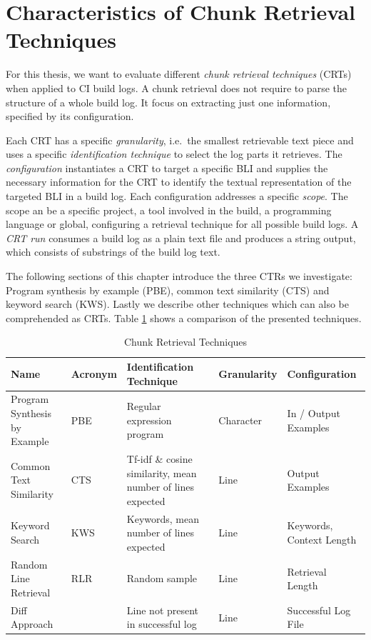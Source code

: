\documentclass[\myrootdir/main.tex]{subfiles}
\begin{document}
\section{Characteristics of Chunk Retrieval Techniques}
\label{sec:blirt}
For this thesis, we want to evaluate different \emph{chunk retrieval techniques} (CRTs) when applied to CI build logs.
A chunk retrieval does not require to parse the structure of a whole build log.
It focus on extracting just one information, specified by its configuration.

Each CRT has a specific \textit{granularity}, i.e.\ the smallest retrievable text piece and uses a specific \textit{identification technique} to select the log parts it retrieves.
The \textit{configuration} instantiates a CRT to target a specific BLI and supplies the necessary information for the CRT to identify the textual representation of the targeted BLI in a build log.
Each configuration addresses a specific \textit{scope}.
The scope an be a specific project, a tool involved in the build, a programming language or global, configuring a retrieval technique for all possible build logs.
A \textit{CRT run} consumes a build log as a plain text file and produces a string output, which consists of substrings of the build log text.

The following sections of this chapter introduce the three CTRs we investigate: Program synthesis by example (PBE), common text similarity (CTS) and keyword search (KWS).
Lastly we describe other techniques which can also be comprehended as CRTs.
Table \ref{tab:ctr} shows a comparison of the presented techniques.

\begin{table}[htbp]
\centering
\caption{Chunk Retrieval Techniques}
\begin{tabularx}{\textwidth}{|X|l|X|l|X|} 
\hline
Name                         & Acronym & Identification Technique                                   & Granularity & Configuration             \\ 
\hline
\hline
Program Synthesis by Example & PBE     & Regular expression program                                 & Character   & In / Output Examples      \\
\hline
Common Text Similarity       & CTS     & Tf-idf \& cosine similarity, mean number of lines expected & Line        & Output Examples           \\
\hline
Keyword Search               & KWS     & Keywords, mean number of lines expected                    & Line        & Keywords, Context Length  \\
\hline
Random Line Retrieval        & RLR     & Random sample                                              & Line        & Retrieval Length          \\
\hline
Diff Approach                &         & Line not present in successful log                         & Line        & Successful Log File       \\
\hline
\end{tabularx}
\label{tab:ctr}
\end{table}
\end{document}
